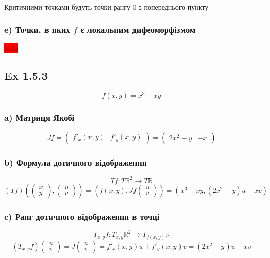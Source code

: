 \documentclass[10pt, a4paper]{article} %
\newcommand{\R}{\mathbb{R}}
\newcommand{\J}{J}
\newcommand{\todo}[1]{\colorbox{red}{#1}}
\begin{document}
Критичними точками будуть точки рангу 0 з попереднього пункту

\subsubsection*{e) Точки, в яких $f$ є локальним дифеоморфізмом}
\todo{todo}


\subsection*{Ex 1.5.3}
\begin{mdframed}
    \[f(x,y) = x^3 - xy\]
\end{mdframed}

\subsubsection*{a) Матриця Якобі}
\[\J f = \begin{pmatrix}
    f'_x(x,y) & f'_y(x,y)
\end{pmatrix} = \begin{pmatrix}
    2x^2-y & -x
\end{pmatrix}\]

\subsubsection*{b) Формула дотичного відображення}
\[Tf : T\R^2 \to T\R\]
\[(Tf)\left(\begin{pmatrix} x \\ y \end{pmatrix}, \begin{pmatrix} u \\ v \end{pmatrix}\right) 
= \left(f(x,y),\J f \begin{pmatrix} u \\ v \end{pmatrix}\right) 
= \left(x^3 - xy, (2x^2-y)u - xv\right)\]

\subsubsection*{c) Ранг дотичного відображення в точці}
\[T_{x,y} f : T_{x,y}\R^2 \to T_{f(x,y)}\R\]
\[(T_{x,y} f) \begin{pmatrix} u \\ v \end{pmatrix}
= J\begin{pmatrix} u \\ v \end{pmatrix} = f'_x(x,y) u + f'_y(x,y) v = (2x^2-y)u - xv\]
\end{document}
